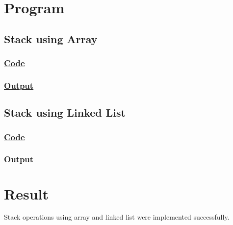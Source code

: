 \section{Program}

\subsection{Stack using Array}

\subsubsection{\underline{Code}}



\subsubsection{\underline{Output}}



\subsection{Stack using Linked List}

\subsubsection{\underline{Code}}



\subsubsection{\underline{Output}}



\vfill

\section{Result}
{\Large\color{white}
Stack operations using array and linked list were implemented successfully.
\color{black}}

\clearpage